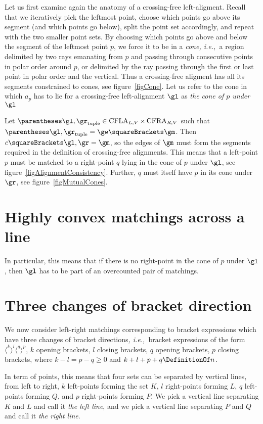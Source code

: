 \documentclass[10pt, a4paper, twoside]{basestyle}
\newcommand{\idest}{\emph{, i.e.,\ }}
\DeclareMathOperator{\CFLA}{CFLA}
\DeclareMathOperator{\CFRA}{CFRA}
\begin{document}
Let us first examine again the anatomy of a crossing-free left-aligment. Recall that we iteratively
pick the leftmost point, choose which points go above its segment (and which points go below),
split the point set accordingly, and repeat with the two smaller point sets.
By choosing which points go above and below the segment of the leftmost point $p$, we force it to be in a
\emph{cone}\idest a region delimited by two rays emanating from $p$ and passing through consecutive points
in polar order around $p$, or delimited by the ray passing through the first or last point in polar order
and the vertical. Thus a crossing-free aligment has all its segments constrained
to cones, see figure~\ref{figCone}. Let us refer to the cone in which $a_p$ has to lie for a crossing-free
left-alignment $\gl$ as \emph{the cone of $p$ under $\gl$}

Let $\tuple{\gl,\gr}\in \CFLA_{L,V}\Cartesian\CFRA_{R,V}$ such that $\tuple{\gl,\gr} = \gw\of\gm$.
Then $c\of{\gl,\gr}=\gm$, so the edges of $\gm$ must form the segments required in the definition
of crossing-free alignments. This means that a left-point $p$ must be matched to a right-point $q$
lying in the cone of $p$ under $\gl$, see figure~\ref{figAlignmentConsistency}.
Further, $q$ must itself have $p$ in its cone under $\gr$, see figure~\ref{figMutualCones}.
\section{Highly convex matchings across a line}
In particular, this means that if there is no right-point in the cone of $p$ under $\gl$,
then $\gl$ has to be part of an overcounted pair of matchings.
\section{Three changes of bracket direction}
We now consider left-right matchings corresponding to bracket expressions which have three
changes of bracket directions\idest bracket expressions of the form
$\langle^k\rangle^l\langle^q\rangle^p$,
$k$ opening brackets, $l$ closing brackets, $q$ opening brackets, $p$ closing brackets, where
$k-l=p-q\geq 0$ and $k+l+p+q\DefinitionOf n$.

In term of points, this means that four sets can be separated by vertical lines, from left
to right, $k$ left-points forming the set $K$, $l$ right-points forming $L$, $q$ left-points
forming $Q$, and $p$ right-points forming $P$.
We pick a vertical line separating $K$ and $L$ and call it \emph{the left line}, and we pick
a vertical line separating $P$ and $Q$ and call it \emph{the right line}.
\end{document}

